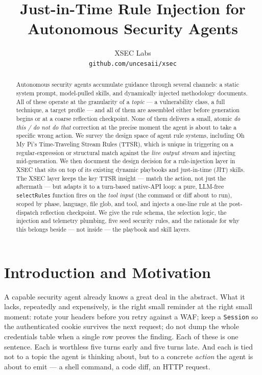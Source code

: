 \documentclass[11pt]{article}
\title{Just-in-Time Rule Injection for Autonomous Security Agents}
\author{
  XSEC Labs \\
  \texttt{github.com/uncesaii/xsec}
}
\date{}
\begin{document}
\maketitle

\begin{abstract}
Autonomous security agents accumulate guidance through several channels: a
static system prompt, model-pulled skills, and dynamically injected
methodology documents. All of these operate at the granularity of a
\emph{topic} --- a vulnerability class, a full technique, a target profile ---
and all of them are assembled either before generation begins or at a
coarse reflection checkpoint. None of them delivers a small, atomic
\emph{do this / do not do that} correction at the precise moment the agent is
about to take a specific wrong action. We survey the design space of
agent rule systems, including Oh My Pi's Time-Traveling Stream Rules (TTSR),
which is unique in triggering on a regular-expression or structural match
against the \emph{live output stream} and injecting mid-generation. We then
document the design decision for a rule-injection layer in XSEC that sits on
top of its existing dynamic playbooks and just-in-time (JIT) skills. The XSEC
layer keeps the key TTSR insight --- match the action, not just the aftermath
--- but adapts it to a turn-based native-API loop: a pure, LLM-free
\texttt{selectRules} function fires on the \emph{tool input} (the command or
diff about to run), scoped by phase, language, file glob, and tool, and injects
a one-line rule at the post-dispatch reflection checkpoint. We give the rule
schema, the selection logic, the injection and telemetry plumbing, five seed
security rules, and the rationale for why this belongs beside --- not inside ---
the playbook and skill layers.
\end{abstract}

\section{Introduction and Motivation}

A capable security agent already knows a great deal in the abstract. What it
lacks, repeatedly and expensively, is the right small reminder at the right
small moment: rotate your headers before you retry against a WAF; keep a
\texttt{Session} so the authenticated cookie survives the next request; do not
dump the whole credentials table when a single row proves the finding. Each of
these is one sentence. Each is worthless five turns early and five turns late.
And each is tied not to a topic the agent is thinking about, but to a concrete
\emph{action} the agent is about to emit --- a shell command, a code diff, an
HTTP request.
\end{document}
